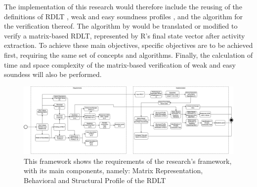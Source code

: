 The implementation of this research would therefore include the reusing of the definitions of RDLT \cite{Malinao2017}, weak and easy soundness profiles \cite{Ramirez2024}, and the algorithm for the verification thereof. The algorithm by \cite{Ramirez2024} would be translated or modified to verify a matrix-based RDLT, represented by R's final state vector after activity extraction. To achieve these main objectives, specific objectives are to be achieved first, requiring the same set of concepts and algorithms. Finally, the calculation of time and space complexity of the matrix-based verification of weak and easy soundess will also be performed. 


\begin{figure}[p]
    \centering
    \includegraphics[width=\paperwidth, angle=90]{../figures/Conceptual Framework.png}
    \caption{This framework shows the requirements of the research's framework, with its main components, namely: Matrix Representation, Behavioral and Structural Profile of the RDLT}
\end{figure}